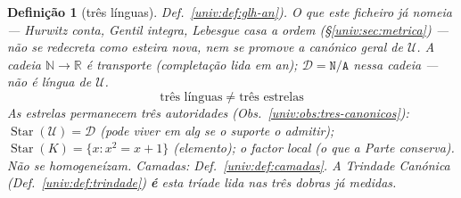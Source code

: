 \documentclass[11pt,a4paper]{article}
\newtheorem{definicao}[teorema]{Definição}
\begin{document}
\begin{definicao}[três línguas]
Def.~\ref{univ:def:glh-an}).
O que este ficheiro já nomeia --- Hurwitz conta, Gentil integra,
Lebesgue casa a ordem (\S\ref{univ:sec:metrica}) --- não se
redecreta como esteira nova, nem se promove a canónico geral de
\(\mathcal{U}\).
A cadeia \(\mathbb{N}\to\mathbb{R}\) é transporte (completação lida
em an); \(\mathcal{D}=\texttt{N/A}\) nessa cadeia --- não é língua
de \(\mathcal{U}\).
\[
\boxed{\;
\text{três línguas}
\;\neq\;
\text{três estrelas}
\;}
\]
As estrelas permanecem três autoridades
(Obs.~\ref{univ:obs:tres-canonicos}):
\(\operatorname{Star}(\mathcal{U})=\mathcal{D}\)
(pode viver em alg se o suporte o admitir);
\(\operatorname{Star}(K)=\{x:x^{2}=x+1\}\) (elemento);
o factor local (o que a Parte conserva). Não se homogeneízam.
Camadas: Def.~\ref{univ:def:camadas}.
A Trindade Canónica (Def.~\ref{univ:def:trindade})
\textbf{é} esta tríade lida nas três dobras já medidas.
\end{definicao}
\end{document}
